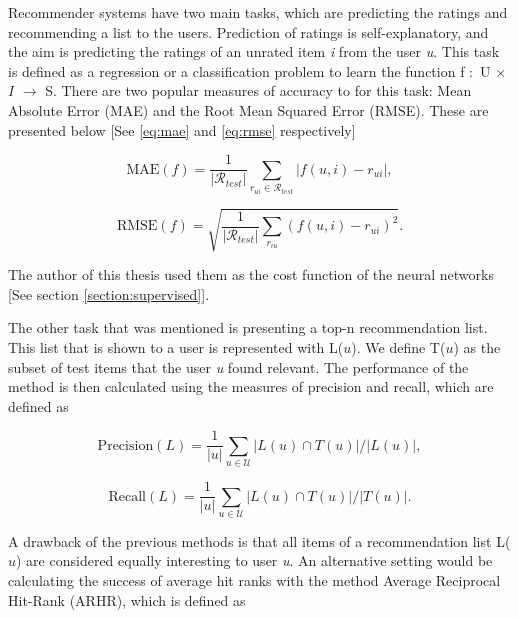 Recommender systems have two main tasks, which are predicting the ratings and recommending a list to the users. Prediction of ratings is self-explanatory, and the aim is predicting the ratings of an unrated item \textit{i} from the user \textit{u}. This task is defined as a regression or a classification problem to learn the function f $\colon$ U $\times$ $I$ $\rightarrow$ S. There are two popular measures of accuracy to for this task: Mean Absolute Error (MAE) and the Root Mean Squared Error (RMSE). These are presented below [See \eqref{eq:mae} and \eqref{eq:rmse} respectively]

\begin{equation}
\mathrm { MAE } ( f ) = \frac { 1 } { \left| \mathcal { R } _ {test} \right| } \sum _ { r _ { u i } \in \mathcal { R } _ {test} } \left| f ( u , i ) - r _ { u i } \right| ,
\label{eq:mae}
\end{equation}

\begin{equation}
\mathrm { RMSE } ( f ) = \sqrt { \frac { 1 } { \left| \mathcal { R } _ { test} \right| } \sum _ { r _ { i u } } \left( f ( u , i ) - r _ { u i } \right) ^ { 2 } } .
\label{eq:rmse}
\end{equation}

The author of this thesis used them as the cost function of the neural networks [See section \ref{section:supervised}].


The other task that was mentioned  is presenting a top-n recommendation list. This list that is shown to a user is represented with L($u$). We define T($u$) as the subset of test items that the user \textit{u} found relevant. The performance of the method is then calculated using the measures of precision and recall, which are defined as

\begin{equation}
\mathrm { Precision } ( L ) = \frac { 1 } { | u | } \sum _ { u \in \mathcal { U } } | L ( u ) \cap T ( u ) | / | L ( u ) | ,
\label{eq:precision}
\end{equation}

\begin{equation}
\mathrm { Recall } ( L ) = \frac { 1 } { | u | } \sum _ { u \in \mathcal { U } } | L ( u ) \cap T ( u ) | / | T ( u ) | .
\label{eq:recall}
\end{equation}

A drawback of the previous methods is that all items of a recommendation list L($u$) are considered equally interesting to user \textit{u}. An alternative setting would be calculating the success of average hit ranks with the method Average Reciprocal Hit-Rank (ARHR), which is defined as


